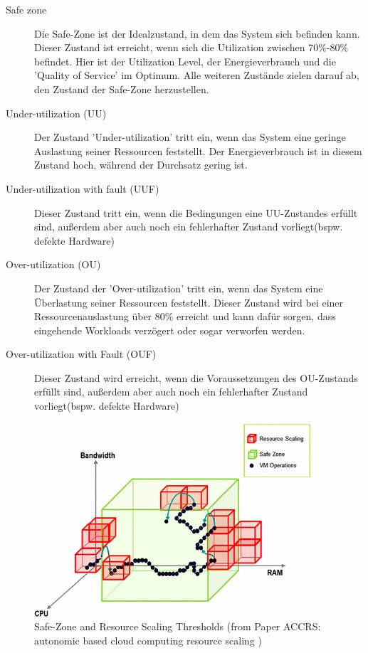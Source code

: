 \documentclass[a4paper,10pt]{scrartcl}
\begin{document}
\begin{description}
\item[Safe zone]
Die Safe-Zone ist der Idealzustand, in dem das System sich befinden kann. Dieser Zustand ist erreicht, wenn sich die Utilization zwischen 70\%-80\% befindet. Hier ist der Utilization Level, der Energieverbrauch und die 'Quality of Service' im Optimum.
Alle weiteren Zustände zielen darauf ab, den Zustand der Safe-Zone herzustellen.
\item[Under-utilization (UU)]
Der Zustand 'Under-utilization' tritt ein, wenn das System eine geringe Auslastung seiner Ressourcen feststellt. Der Energieverbrauch ist in diesem Zustand hoch, während der Durchsatz gering ist.
\item[Under-utilization with fault (UUF)]
Dieser Zustand tritt ein, wenn die Bedingungen eine UU-Zustandes erfüllt sind, außerdem aber auch noch ein fehlerhafter Zustand vorliegt(bspw. defekte Hardware)
\item[Over-utilization (OU)]
Der Zustand der 'Over-utilization' tritt ein, wenn das System eine Überlastung seiner Ressourcen feststellt. Dieser Zustand wird bei einer Ressourcenauslastung über 80\% erreicht und kann dafür sorgen, dass eingehende Workloads verzögert oder sogar verworfen werden.
\item[Over-utilization with Fault (OUF)]
Dieser Zustand wird erreicht, wenn die Voraussetzungen des OU-Zustands erfüllt sind, außerdem aber auch noch ein fehlerhafter Zustand vorliegt(bspw. defekte Hardware)
\end{description}

\begin{figure}[htbp]
  \centering
  \includegraphics[scale=1.2]{img/SDTScaling.png}
  \caption{Safe-Zone and Resource Scaling Thresholds (from Paper ACCRS: autonomic based cloud computing resource scaling )}
\end{figure}
\end{document}
